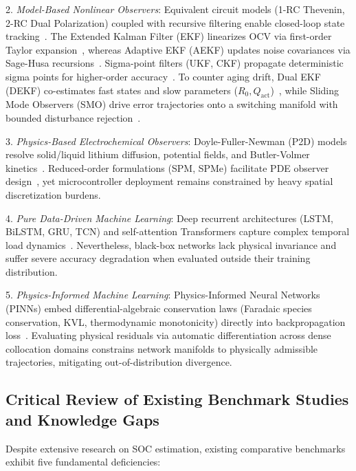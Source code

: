 \documentclass[preprint,12pt]{elsarticle}
\begin{document}
2. \emph{Model-Based Nonlinear Observers}: Equivalent circuit models (1-RC Thevenin, 2-RC Dual Polarization) coupled with recursive filtering enable closed-loop state tracking~\cite{He2011ecm,Hu2012ecm}. The Extended Kalman Filter (EKF) linearizes OCV via first-order Taylor expansion~\cite{Plett2004part3,Santhanagopalan2006jes}, whereas Adaptive EKF (AEKF) updates noise covariances via Sage-Husa recursions~\cite{Han2019aekf,Wang2021tcn}. Sigma-point filters (UKF, CKF) propagate deterministic sigma points for higher-order accuracy~\cite{Plett2006ukf,He2013ukf,Peng2021ackf}. To counter aging drift, Dual EKF (DEKF) co-estimates fast states and slow parameters ($R_0, Q_{\text{act}}$)~\cite{Charkhgard2010dekf,Yang2024degradation}, while Sliding Mode Observers (SMO) drive error trajectories onto a switching manifold with bounded disturbance rejection~\cite{Kim2011,Chen2016smo,Feng2019smo}.

3. \emph{Physics-Based Electrochemical Observers}: Doyle-Fuller-Newman (P2D) models resolve solid/liquid lithium diffusion, potential fields, and Butler-Volmer kinetics~\cite{Doyle1993,Torchio2016pybam,Northrop2014p2d}. Reduced-order formulations (SPM, SPMe) facilitate PDE observer design~\cite{DiDomenico2010spm,Moura2017pde,Marquis2019spme}, yet microcontroller deployment remains constrained by heavy spatial discretization burdens.

4. \emph{Pure Data-Driven Machine Learning}: Deep recurrent architectures (LSTM, BiLSTM, GRU, TCN) and self-attention Transformers capture complex temporal load dynamics~\cite{Hansen2005svr,Chemali2018dnn,Liu2020gpr,Song2019bilstm,Jiao2020attn,Wang2021tcn,Vaswani2017attention,Shen2023transformer}. Nevertheless, black-box networks lack physical invariance and suffer severe accuracy degradation when evaluated outside their training distribution.

5. \emph{Physics-Informed Machine Learning}: Physics-Informed Neural Networks (PINNs) embed differential-algebraic conservation laws (Faradaic species conservation, KVL, thermodynamic monotonicity) directly into backpropagation loss~\cite{Raissi2019pinn,Brancato2026,Li2023nature}. Evaluating physical residuals via automatic differentiation across dense collocation domains constrains network manifolds to physically admissible trajectories, mitigating out-of-distribution divergence.

\subsection{Critical Review of Existing Benchmark Studies and Knowledge Gaps}
Despite extensive research on SOC estimation, existing comparative benchmarks exhibit five fundamental deficiencies:
\end{document}
